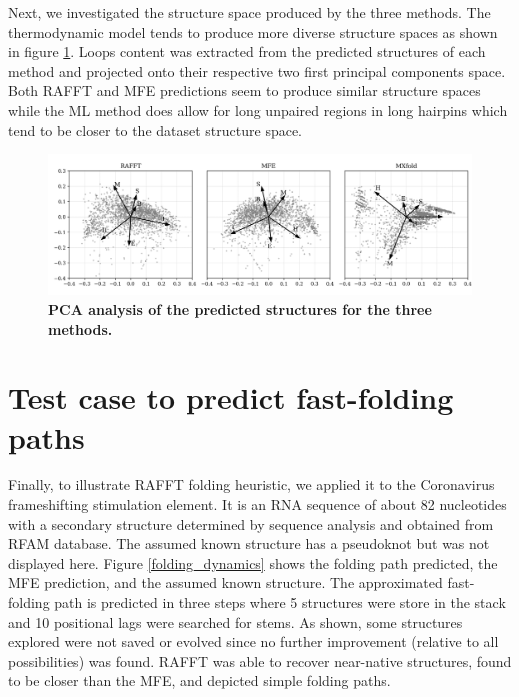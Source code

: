 \documentclass[a4paper,12pt]{article}
\begin{document}
{{Next, we investigated the structure space produced by the three methods. The
thermodynamic model tends to produce more diverse structure spaces as shown in
figure \ref{pred_struct_space}. Loops content was extracted from the predicted
structures of each method and projected onto their respective two first
principal components space. Both RAFFT and MFE predictions seem to produce
similar structure spaces while the ML method does allow for long unpaired
regions in long hairpins which tend to be closer to the dataset structure space.

\begin{figure}[htbp]
\centering
\includegraphics[width=.9\linewidth]{img/content_predicted_data.png}
\caption{\label{pred_struct_space}\textbf{PCA analysis of the predicted structures for the three methods.}}
\end{figure}

\clearpage
\section{Test case to predict fast-folding paths}
\label{sec:orgf5d99d2}
Finally, to illustrate RAFFT folding heuristic, we applied it to the Coronavirus
frameshifting stimulation element. It is an RNA sequence of about 82 nucleotides
with a secondary structure determined by sequence analysis and obtained from
RFAM database. The assumed known structure has a pseudoknot but was not
displayed here. Figure \ref{folding_dynamics} shows the folding path predicted,
the MFE prediction, and the assumed known structure. The approximated
fast-folding path is predicted in three steps where 5 structures were store in
the stack and 10 positional lags were searched for stems. As shown, some
structures explored were not saved or evolved since no further improvement
(relative to all possibilities) was found. RAFFT was able to recover near-native
structures, found to be closer than the MFE, and depicted simple folding paths.


}}
\end{document}
